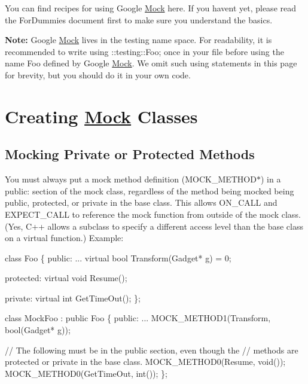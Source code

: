 You can find recipes for using Google \hyperlink{classMock}{Mock} here. If you haven\textquotesingle{}t yet, please read the For\+Dummies document first to make sure you understand the basics.

{\bfseries Note\+:} Google \hyperlink{classMock}{Mock} lives in the {\ttfamily testing} name space. For readability, it is recommended to write {\ttfamily using \+::testing\+::\+Foo;} once in your file before using the name {\ttfamily Foo} defined by Google \hyperlink{classMock}{Mock}. We omit such {\ttfamily using} statements in this page for brevity, but you should do it in your own code.

\section*{Creating \hyperlink{classMock}{Mock} Classes}

\subsection*{Mocking Private or Protected Methods}

You must always put a mock method definition ({\ttfamily M\+O\+C\+K\+\_\+\+M\+E\+T\+H\+O\+D$\ast$}) in a {\ttfamily public\+:} section of the mock class, regardless of the method being mocked being {\ttfamily public}, {\ttfamily protected}, or {\ttfamily private} in the base class. This allows {\ttfamily O\+N\+\_\+\+C\+A\+LL} and {\ttfamily E\+X\+P\+E\+C\+T\+\_\+\+C\+A\+LL} to reference the mock function from outside of the mock class. (Yes, C++ allows a subclass to specify a different access level than the base class on a virtual function.) Example\+:


\begin{DoxyCode}
\textcolor{keyword}{class }Foo \{
 \textcolor{keyword}{public}:
  ...
  \textcolor{keyword}{virtual} \textcolor{keywordtype}{bool} Transform(Gadget* g) = 0;

 \textcolor{keyword}{protected}:
  \textcolor{keyword}{virtual} \textcolor{keywordtype}{void} Resume();

 \textcolor{keyword}{private}:
  \textcolor{keyword}{virtual} \textcolor{keywordtype}{int} GetTimeOut();
\};

\textcolor{keyword}{class }MockFoo : \textcolor{keyword}{public} Foo \{
 \textcolor{keyword}{public}:
  ...
  MOCK\_METHOD1(Transform, \textcolor{keywordtype}{bool}(Gadget* g));

  \textcolor{comment}{// The following must be in the public section, even though the}
  \textcolor{comment}{// methods are protected or private in the base class.}
  MOCK\_METHOD0(Resume, \textcolor{keywordtype}{void}());
  MOCK\_METHOD0(GetTimeOut, \textcolor{keywordtype}{int}());
\};
\end{DoxyCode}


